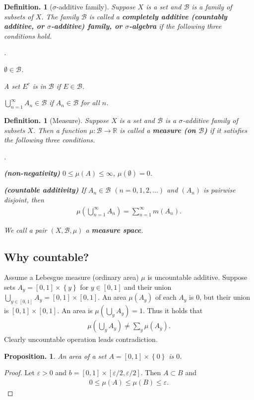 \documentclass[openany, a4paper, oneside]{jsbook}
\newcounter{enum2}
\renewenvironment{enumerate}{%
\begin{list}%
{%
\arabic{enum2}.\ \,%
}%
{%
\usecounter{enum2}
\setlength{\itemindent}{0pt}%
\setlength{\leftmargin}{15pt}%
\setlength{\rightmargin}{0pt}%
\setlength{\labelsep}{0pt}%
\setlength{\labelwidth}{6pt}%
\setlength{\itemsep}{0pt}%
\setlength{\parsep}{0pt}%
\setlength{\listparindent}{0pt}%
}
}{%
\end{list}%
}
\theoremstyle{break}
\newtheorem{prop}[thm]{Proposition.}
\theoremstyle{breakdefn}
\newtheorem{defn}[thm]{Definition.}
\newcommand{\rbk}[1]{\left (#1\right)}
\newcommand{\sqbk}[1]{\left[#1\right]}
\newcommand{\cbk}[1]{\left\{#1\right\}}
\newcommand{\bbR}{\mathbb{R}}
\newcommand{\calB}{\mathcal{B}}
\newcommand{\upbf}[1]{\textup{\textbf{#1}}}
\begin{document}
\begin{defn}[$\sigma$-additive family]
 Suppose $X$ is a set and $\calB$ is a family of subsets of $X$.
 The family $\calB$ is called a \upbf{completely additive (countably additive, or $\sigma$-additive) family, or $\sigma$-algebra}
 if the following three conditions hold.
\begin{enumerate}
\item $\emptyset \in \calB$.
\item A set $E^{c}$ is in $\calB$ if $E \in \calB$.
\item $\bigcup_{n=1}^{\infty} A_n \in \calB$ if $A_n \in \calB$ for all $n$.
\end{enumerate}
\end{defn}
\begin{defn}[Measure]
 Suppose $X$ is a set and $\calB$ is a $\sigma$-additive family of subsets $X$.
 Then a function $\mu \colon \calB \to \bbR$ is called a \upbf{measure (on $\calB$)}
 if it satisfies the following three conditions.
\begin{enumerate}
\item \upbf{(non-negativity)} $0 \leq \mu (A) \leq \infty$, $\mu (\emptyset) = 0$.
\item \upbf{(countable additivity)} If $A_n \in \calB$ $(n = 0, 1, 2, \dots)$ and $(A_n)$ is pairwise disjoint, then
    \begin{align}
     \mu \rbk{\bigcup_{n=1}^{\infty} A_n} = \sum_{n=1}^{\infty} m (A_n).
    \end{align}
\end{enumerate}
 We call a pair $(X, \calB, \mu)$ a \upbf{measure space}.
\end{defn}
\subsection{Why countable?}


Assume a Lebesgue measure (ordinary area) $\mu$ is uncountable additive.
Suppose sets $A_y = \sqbk{0, 1} \times \cbk{y}$ for $y \in \sqbk{0, 1}$
and their union $\bigcup_{y \in \sqbk{0, 1}} A_y = \sqbk{0, 1} \times \sqbk{0, 1}$.
An area $\mu (A_y)$ of each $A_y$ is 0, but their union is $\sqbk{0, 1} \times \sqbk{0, 1}$.
An area is $\mu (\bigcup_y A_y) = 1$.
Thus it holds that
\begin{align}
 \mu \rbk{ \bigcup_y A_y}
 \neq
 \sum_y \mu (A_y).
\end{align}
Clearly uncountable operation leads contradiction.
\begin{prop}
 An area of a set $A = \sqbk{0, 1} \times \cbk{0}$ is $0$.
\end{prop}
\begin{proof}
Let $\varepsilon > 0$ and $b = \sqbk{0, 1} \times \sqbk{\varepsilon / 2, \varepsilon / 2}$.
Then $A \subset B$ and
\begin{align}
 0
 \leq
 \mu (A)
 \leq
 \mu (B)
 \leq
 \varepsilon.
\end{align}
\end{proof}
\end{document}
